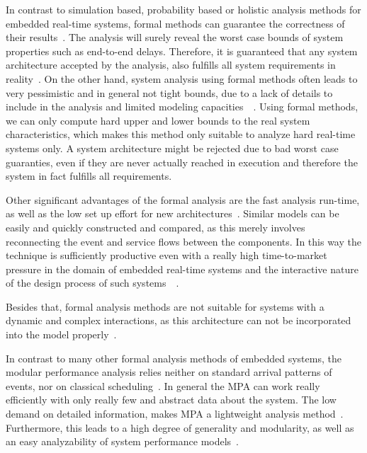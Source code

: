 \label{discussion}

In contrast to simulation based, probability based or holistic analysis methods for embedded real-time systems, formal methods can guarantee the correctness of their results~\cite{wan:06}.
The analysis will surely reveal the worst case bounds of system properties such as end-to-end delays.
Therefore, it is guaranteed that any system architecture accepted by the analysis, also fulfills all system requirements in reality~\cite{wan:06}.
On the other hand, system analysis using formal methods often leads to very pessimistic and in general not tight bounds, due to
a lack of details to include in the analysis and limited modeling capacities~\cite{wan:05}~\cite{cho:08}.
Using formal methods, we can only compute hard upper and lower bounds to the real system characteristics, which makes this method only suitable to analyze hard real-time systems only.
A system architecture might be rejected due to bad worst case guaranties, even if they are never actually reached
in execution and therefore the system in fact fulfills all requirements\cite{wan:06}.

Other significant advantages of the formal analysis are the fast analysis run-time, as well as the low set up effort for new architectures~\cite{wan:06}.
Similar models can be easily and quickly constructed and compared, as this merely involves reconnecting the event and service flows between the components.
In this way the technique is sufficiently productive even with a really high time-to-market pressure in the domain of embedded real-time systems and 
the interactive nature of the design process of such systems~\cite{ver}~\cite{hoo}.

Besides that, formal analysis methods are not suitable for systems with a dynamic and complex interactions, as this architecture can not be incorporated into the model properly~\cite{wan:06}.


In contrast to many other formal analysis methods of embedded systems, the modular performance
analysis relies neither on standard arrival patterns of events, nor on classical scheduling~\cite{pha}.
In general the MPA can work really efficiently with only really few and abstract data about the system.
The low demand on detailed information, makes MPA a lightweight analysis method~\cite{wan:06}.
Furthermore, this leads to a high degree of generality and modularity, as well as an easy analyzability of system performance models~\cite{wan:06}.

